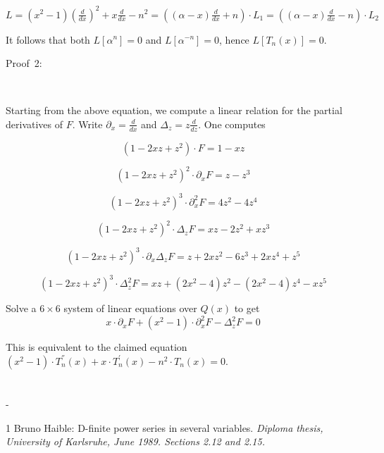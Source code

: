 \documentclass[12pt,a4paper,oneside,onecolumn]{article}
\makeatletter
\newenvironment{lyxsectionbibliography}
{
\section*{\refname}
\@mkboth{\uppercase{\refname}}{\uppercase{\refname}}
\begin{list}{}{
\itemindent-\leftmargin
\labelsep 0pt
\renewcommand{\makelabel}{}
}
}
{\end{list}}
\makeatother
\begin{document}
 \( L=(x^{2}-1)\left( \frac{d}{dx}\right) ^{2}+x\frac{d}{dx}-n^{2}=\left( (\alpha -x)\frac{d}{dx}+n\right) \cdot L_{1}=\left( (\alpha -x)\frac{d}{dx}-n\right) \cdot L_{2} \)

It follows that both  \( L[\alpha ^{n}]=0 \) and  \( L[\alpha ^{-n}]=0 \), hence  \( L[T_{n}(x)]=0 \).

\begin{description}

\item [Proof~2:]~

\end{description}

Starting from the above equation, we compute a linear relation for
the partial derivatives of  \( F \). Write  \( \partial _{x}=\frac{d}{dx} \) and  \( \Delta _{z}=z\frac{d}{dz} \). One computes


\[
\left( 1-2xz+z^{2}\right) \cdot F=1-xz\]

\[
\left( 1-2xz+z^{2}\right) ^{2}\cdot \partial _{x}F=z-z^{3}\]

\[
\left( 1-2xz+z^{2}\right) ^{3}\cdot \partial _{x}^{2}F=4z^{2}-4z^{4}\]

\[
\left( 1-2xz+z^{2}\right) ^{2}\cdot \Delta _{z}F=xz-2z^{2}+xz^{3}\]

\[
\left( 1-2xz+z^{2}\right) ^{3}\cdot \partial _{x}\Delta _{z}F=z+2xz^{2}-6z^{3}+2xz^{4}+z^{5}\]

\[
\left( 1-2xz+z^{2}\right) ^{3}\cdot \Delta _{z}^{2}F=xz+(2x^{2}-4)z^{2}-(2x^{2}-4)z^{4}-xz^{5}\]


Solve a  \( 6\times 6 \) system of linear equations over  \( Q(x) \) to get 
\[
x\cdot \partial _{x}F+(x^{2}-1)\cdot \partial _{x}^{2}F-\Delta _{z}^{2}F=0\]


This is equivalent to the claimed equation  \( (x^{2}-1)\cdot T_{n}^{''}(x)+x\cdot T_{n}^{'}(x)-n^{2}\cdot T_{n}(x)=0 \).

\begin{lyxsectionbibliography}

\item [1] Bruno Haible: D-finite power series in several variables. \em Diploma
thesis, University of Karlsruhe, June 1989. \em Sections 2.12 and
2.15.

\end{lyxsectionbibliography}
\end{document}
